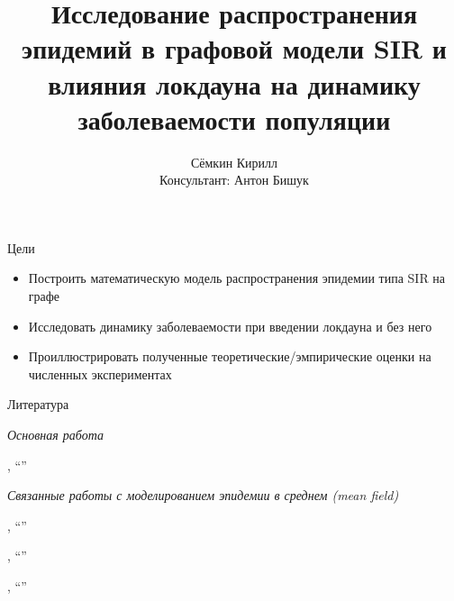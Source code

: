 
\usepackage[backend=biber]{biblatex}
\usepackage{usebib}
\usepackage[justification=centering]{caption}



\author{Сёмкин Кирилл \\ Консультант: Антон Бишук}
\date{}
\title{Исследование распространения эпидемий в графовой модели SIR и влияния локдауна на динамику заболеваемости популяции}




	
	\begin{frame}[c]
		\titlepage
	\end{frame}

	\begin{frame}{Цели}
		
		\begin{itemize}
			\item Построить математическую модель распространения эпидемии типа SIR на графе
			\item Исследовать динамику заболеваемости при введении локдауна и без него
			\item Проиллюстрировать полученные теоретические/эмпирические оценки на численных экспериментах
		\end{itemize}
	
	\end{frame}

	\begin{frame}{Литература}
		
	{\large \textit{Основная работа}} \medskip
	
	\citeauthor{base_article}, ``\textit{}'' \bigskip
	
	{\large \textit{Связанные работы с моделированием эпидемии в среднем (mean field)}} \medskip
	
	\citeauthor{moreno2002epidemic}, ``\textit{}''
	
	\citeauthor{gomez2010discrete}, ``\textit{}''
	
	\citeauthor{pastor2015epidemic}, ``\textit{}''
		
	\end{frame}

